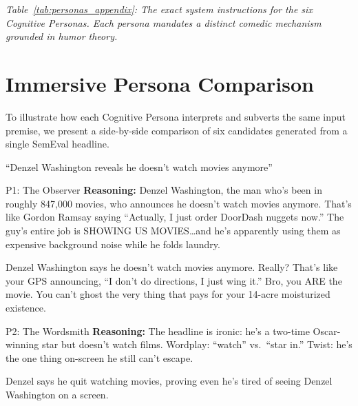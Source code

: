\documentclass[11pt]{article}
\begin{document}
\vspace{1em}
\noindent\small\textit{Table~\ref{tab:personas_appendix}: The exact system instructions for the six Cognitive Personas. Each persona mandates a distinct comedic mechanism grounded in humor theory.}
\label{tab:personas_appendix}

\clearpage

\section{Immersive Persona Comparison}
\label{sec:appendix_persona_comparison}

To illustrate how each Cognitive Persona interprets and subverts the same input premise, we present a side-by-side comparison of six candidates generated from a single SemEval headline.

\vspace{0.5em}
\begin{inputbox}
``Denzel Washington reveals he doesn't watch movies anymore''
\end{inputbox}
\vspace{0.8em}

\noindent

\begin{personabox}[p1color]{P1: The Observer}
\textbf{Reasoning:} Denzel Washington, the man who's been in roughly 847,000 movies, who announces he doesn't watch movies anymore. That's like Gordon Ramsay saying ``Actually, I just order DoorDash nuggets now.'' The guy's entire job is SHOWING US MOVIES\ldots and he's apparently using them as expensive background noise while he folds laundry.
\end{personabox}
\vspace{-1.2em}
\begin{jokebox}
Denzel Washington says he doesn't watch movies anymore. Really? That's like your GPS announcing, ``I don't do directions, I just wing it.'' Bro, you ARE the movie. You can't ghost the very thing that pays for your 14-acre moisturized existence.
\end{jokebox}

\vspace{0.9em}

\begin{personabox}[p2color]{P2: The Wordsmith}
\textbf{Reasoning:} The headline is ironic: he's a two-time Oscar-winning star but doesn't watch films. Wordplay: ``watch'' vs.\ ``star in.'' Twist: he's the one thing on-screen he still can't escape.
\end{personabox}
\vspace{-1.2em}
\begin{jokebox}
Denzel says he quit watching movies, proving even he's tired of seeing Denzel Washington on a screen.
\end{jokebox}
\end{document}
